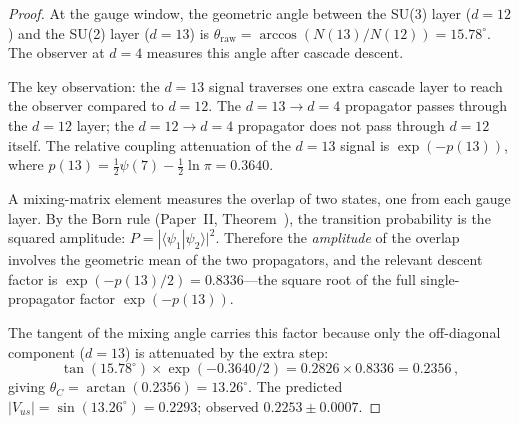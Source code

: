 \documentclass[12pt,a4paper]{article}
\begin{document}
\begin{proof}
At the gauge window, the geometric angle between the SU(3) layer ($d = 12$) and the SU(2) layer ($d = 13$) is $\theta_{\text{raw}} = \arccos(N(13)/N(12)) = 15.78^\circ$. The observer at $d = 4$ measures this angle after cascade descent.

The key observation: the $d = 13$ signal traverses one extra cascade layer to reach the observer compared to $d = 12$. The $d = 13 \to d = 4$ propagator passes through the $d = 12$ layer; the $d = 12 \to d = 4$ propagator does not pass through $d = 12$ itself. The relative coupling attenuation of the $d = 13$ signal is $\exp(-p(13))$, where $p(13) = \tfrac{1}{2}\psi(7) - \tfrac{1}{2}\ln\pi = 0.3640$.

A mixing-matrix element measures the overlap of two states, one from each gauge layer. By the Born rule (Paper~II, Theorem~), the transition probability is the squared amplitude: $P = |\langle\psi_1|\psi_2\rangle|^2$. Therefore the \emph{amplitude} of the overlap involves the geometric mean of the two propagators, and the relevant descent factor is $\exp(-p(13)/2) = 0.8336$---the square root of the full single-propagator factor $\exp(-p(13))$.

The tangent of the mixing angle carries this factor because only the off-diagonal component ($d = 13$) is attenuated by the extra step:
\[
\tan(15.78^\circ) \times \exp(-0.3640/2) = 0.2826 \times 0.8336 = 0.2356\,,
\]
giving $\theta_C = \arctan(0.2356) = 13.26^\circ$. The predicted $|V_{us}| = \sin(13.26^\circ) = 0.2293$; observed $0.2253 \pm 0.0007$.
\end{proof}
\end{document}
